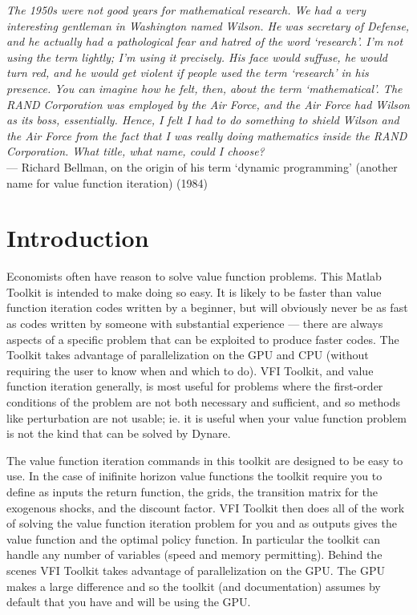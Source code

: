 \documentclass[11pt,fleqn]{article}
\begin{document}
\newpage
\tableofcontents
\newpage

\textit{The 1950s were not good years for mathematical research. We had a very interesting gentleman
in Washington named Wilson. He was secretary of Defense, and he actually had a pathological
fear and hatred of the word ‘research’. I’m not using the term lightly; I’m using it precisely. His
face would suffuse, he would turn red, and he would get violent if people used the term ‘research’
in his presence. You can imagine how he felt, then, about the term ‘mathematical’. The RAND
Corporation was employed by the Air Force, and the Air Force had Wilson as its boss, essentially.
Hence, I felt I had to do something to shield Wilson and the Air Force from the fact that I was really
doing mathematics inside the RAND Corporation. What title, what name, could I choose?} \\
\noindent --- Richard Bellman, on the origin of his term ‘dynamic programming’ (another name for value function iteration) (1984)

\section{Introduction}

Economists often have reason to solve value function problems. This Matlab Toolkit is intended to make doing so easy. It is likely to be faster than value function iteration codes written by a beginner, but will obviously never be as fast as codes written by someone with substantial experience --- there are always aspects of a specific problem that can be exploited to produce faster codes. The Toolkit takes advantage of parallelization on the GPU and CPU (without requiring the user to know when and which to do). VFI Toolkit, and value function iteration generally, is most useful for problems where the first-order conditions of the problem are not both necessary and sufficient, and so methods like perturbation are not usable; ie. it is useful when your value function problem is not the kind that can be solved by Dynare.

The value function iteration commands in this toolkit are designed to be easy to use. In the case of inifinite horizon value functions the toolkit require you to define as inputs the return function, the grids, the transition matrix for the exogenous shocks, and the discount factor. VFI Toolkit then does all of the work of solving the value function iteration problem for you and as outputs gives the value function and the optimal policy function. In particular the toolkit can handle any number of variables (speed and memory permitting). Behind the scenes VFI Toolkit takes advantage of parallelization on the GPU. The GPU makes a large difference and so the toolkit (and documentation) assumes by default that you have and will be using the GPU.
\end{document}
